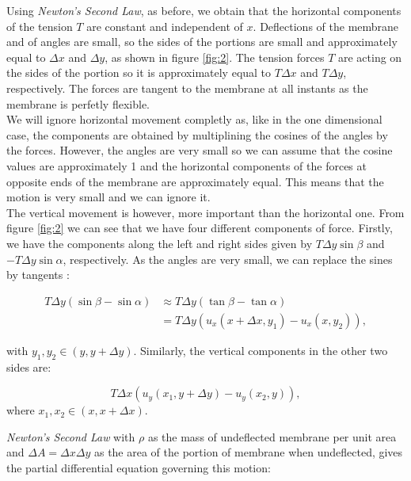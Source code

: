 \documentclass[12pt]{article}
\numberwithin{equation}{section}
\begin{document}
Using \emph{Newton's Second Law}, as before, we obtain that the horizontal components of the tension $T$ are constant and independent of $x$.
Deflections of the membrane and of angles are small, so the sides of the portions are small and approximately equal to $\Delta x$ and $\Delta y$, 
as shown in figure \ref{fig:2}. The tension forces $T$ are acting on the sides of the portion so it is approximately equal to $T\Delta x$ and $T\Delta y$, 
respectively. The forces are tangent to the membrane at all instants as the membrane is perfetly flexible.
\\

We will ignore horizontal movement completly as, like in the one dimensional case, the components are obtained by multiplining the cosines of 
the angles by the forces. However, the angles are very small so we can assume that the cosine values are approximately 1 and the horizontal 
components of the forces at opposite ends of the membrane are approximately equal. This means that the motion is very small and we can ignore it.
\\

The vertical movement is however, more important than the horizontal one. From figure \ref{fig:2} we can see that we have four different components of force.
Firstly, we have the components along the left and right sides given by $T\Delta y \sin\beta$ and $-T\Delta y\sin\alpha$, respectively. As the 
angles are very small, we can replace the sines by tangents \cite{Kr}:

\begin{equation} \label{eq9}
\begin{split} 
    T\Delta y(\sin\beta - \sin\alpha) & \approx T\Delta y(\tan\beta-\tan\alpha)\\
    &= T\Delta y(u_x(x+\Delta x, y_1)-u_x(x, y_2)),
\end{split}
\end{equation}

with $y_1, y_2 \in(y, y+\Delta y)$. Similarly, the vertical components in the other two sides are:

\begin {equation} \label{eq10}
    T\Delta x(u_y(x_1, y+\Delta y)-u_y(x_2,y)),
\end{equation}
where $x_1, x_2 \in(x, x+\Delta x)$.

\emph{Newton's Second Law} with $\rho$ as the mass of undeflected membrane per unit area and $\Delta A=\Delta x\Delta y$ as the area of the portion
of membrane when undeflected, gives the partial differential equation governing this motion:
\end{document}
